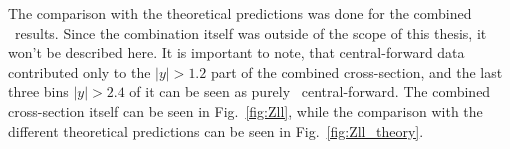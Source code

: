 The comparison with the theoretical predictions was done for the combined \Zll\ results. Since the combination itself was outside of the scope of this thesis, it won't be described here. It is important to note, that \Zee central-forward data contributed only to the $|y| > 1.2$ part of the combined cross-section, and the last three bins $|y| > 2.4$ of it can be seen as purely \Zee\ central-forward. The combined cross-section itself can be seen in Fig.~\ref{fig:Zll}, while the comparison with the different theoretical predictions can be seen in Fig.~\ref{fig:Zll_theory}.

\begin{figure}
\end{figure}

